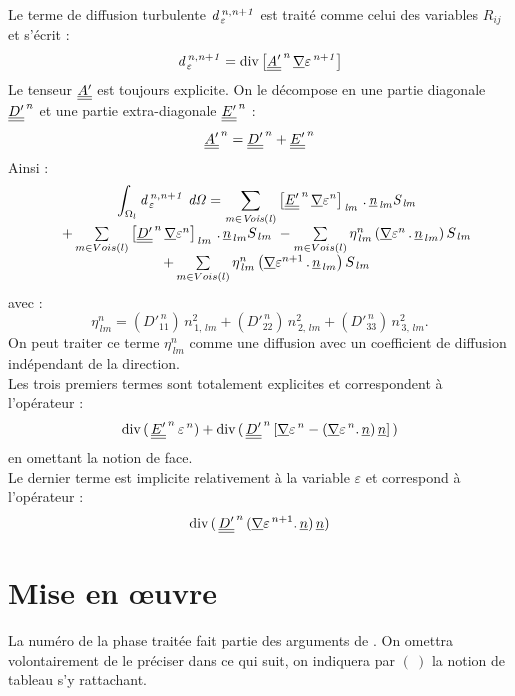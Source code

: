 Le terme de diffusion turbulente $\it{d}^{\,n,n+1}_{\,\varepsilon}$ est trait\'e comme celui des
variables $R_{ij}$ et s'\'ecrit : $$\it{d}_{\,\varepsilon}^{\,n,n+1} = \text{div}\,{\left[
\underline{\underline{A'}}^{\,n}\,\underline{\nabla} {\varepsilon^{\,n+1}} \right]}$$
Le tenseur $\underline{\underline{A'}}$ est toujours explicite.
On le d\'ecompose en une partie diagonale $\underline{\underline{D'}}^{\,n}$ et une partie
extra-diagonale $\underline{\underline{E'}}^{\,n}$ :\\
$$\underline{\underline{A'}}^{\,n} =\underline{\underline{D'}}^{\,n} + \underline{\underline{E'}}^{\,n}$$
Ainsi :
\begin{equation}
\begin{array} {lcl}
&\displaystyle \int_{\Omega_l} \it{d}_{\,\varepsilon}^{\,n,n+1}\ d\Omega =
\sum\limits_{m\in Vois(l)} \left[
\tens{E'}^{\,n}\,\grad{\varepsilon}^n
\right]_{\,lm}\,.\,\vect{n}_{\,lm}S_{\,lm}\\
& + \sum\limits_{m\in Vois(l)} \left[
\tens{D'}^{\,n}\,\grad{\varepsilon}^n
\right]_{\,lm}\,.\,\vect{n}_{\,lm}S_{\,lm}\
- \sum\limits_{m\in Vois(l)}
 \eta^n_{\,lm} \left(\grad{\varepsilon}^{n}\,.\,\vect{n}_{\,lm} \right) S_{\,lm}\\
&+  \sum\limits_{m\in Vois(l)} \eta^n_{\,lm} \left( \grad{\varepsilon}^{n+1}\,.\,\vect{n}_{\,lm} \right) S_{\,lm}
\end{array}
\end{equation}
avec :
$$\eta^n_{\,lm} = (D'^{\,n}_{11})\,n^2_{\,1,\,lm} + (D'^{\,n}_{22})\,n^2_{\,2,\,lm} +
(D'^{\,n}_{33})\,n^2_{\,3,\,lm}.$$
On peut traiter ce terme $\eta^n_{\,lm}$ comme une diffusion avec un coefficient de diffusion ind\'ependant de la direction.\\
Les trois premiers termes sont totalement explicites et correspondent \`a l'op\'erateur :
$$\text{div}\, (\,\underline{\underline{E'}}^{\,n}\,\varepsilon^{\,n}) +
\text{div}\, (\,\underline{\underline{D'}}^{\,n}\,[\underline{\nabla}{\varepsilon^{\,n}} - (\underline{\nabla}{\varepsilon^{\,n}}.\,\underline{n})\,\underline{n}]\,)$$ en omettant la notion de face.\\
Le dernier terme est implicite relativement \`a la variable $\varepsilon$ et correspond \`a l'op\'erateur :
 $$\text{div}\, (\,\underline{\underline{D'}}^{\,n}\,(\underline{\nabla}{\varepsilon^{\,n+1}}.\,\underline{n} )\,\underline{n})$$

\section*{Mise en \oe uvre}
La num\'ero de la phase trait\'ee fait partie des arguments de . On
omettra volontairement de le pr\'eciser dans ce qui suit, on indiquera par $(\ )$ la
notion de tableau s'y rattachant.

